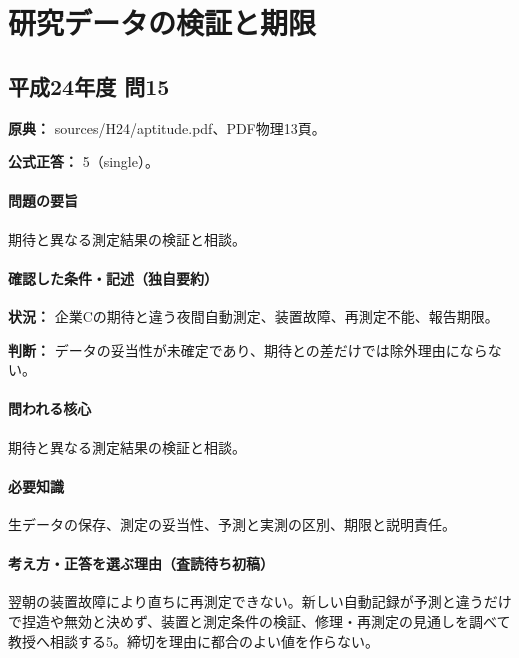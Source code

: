 \section{研究データの検証と期限}

\subsection{平成24年度 問15}
\label{q:h24-reg-apt-15}

\noindent\textbf{原典：} sources/H24/aptitude.pdf、PDF物理13頁。

\textbf{公式正答：} 5（single）。

\paragraph{問題の要旨} 期待と異なる測定結果の検証と相談。

\paragraph{確認した条件・記述（独自要約）}\mbox{}\par

\noindent\textbf{状況：} 企業Cの期待と違う夜間自動測定、装置故障、再測定不能、報告期限。\par

\noindent\textbf{判断：} データの妥当性が未確定であり、期待との差だけでは除外理由にならない。\par

\paragraph{問われる核心} 期待と異なる測定結果の検証と相談。

\paragraph{必要知識} 生データの保存、測定の妥当性、予測と実測の区別、期限と説明責任。

\paragraph{考え方・正答を選ぶ理由（査読待ち初稿）} 翌朝の装置故障により直ちに再測定できない。新しい自動記録が予測と違うだけで捏造や無効と決めず、装置と測定条件の検証、修理・再測定の見通しを調べて教授へ相談する5。締切を理由に都合のよい値を作らない。

